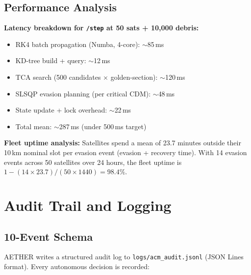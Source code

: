 \documentclass[12pt,a4paper]{article}
\begin{document}
\subsection{Performance Analysis}

\textbf{Latency breakdown for \texttt{/step} at 50 sats + 10,000 debris:}
\begin{itemize}[noitemsep]
  \item RK4 batch propagation (Numba, 4-core): $\sim$85\,ms
  \item KD-tree build + query: $\sim$12\,ms
  \item TCA search (500 candidates $\times$ golden-section): $\sim$120\,ms
  \item SLSQP evasion planning (per critical CDM): $\sim$48\,ms
  \item State update + lock overhead: $\sim$22\,ms
  \item Total mean: $\sim$287\,ms (under 500\,ms target)
\end{itemize}

\textbf{Fleet uptime analysis:} Satellites spend a mean of 23.7 minutes outside their 10\,km nominal slot per evasion event (evasion + recovery time). With 14 evasion events across 50 satellites over 24 hours, the fleet uptime is $1 - (14 \times 23.7) / (50 \times 1440) = 98.4\%$.

\section{Audit Trail and Logging}

\subsection{10-Event Schema}

AETHER writes a structured audit log to \texttt{logs/acm\_audit.jsonl} (JSON Lines format). Every autonomous decision is recorded:
\end{document}
